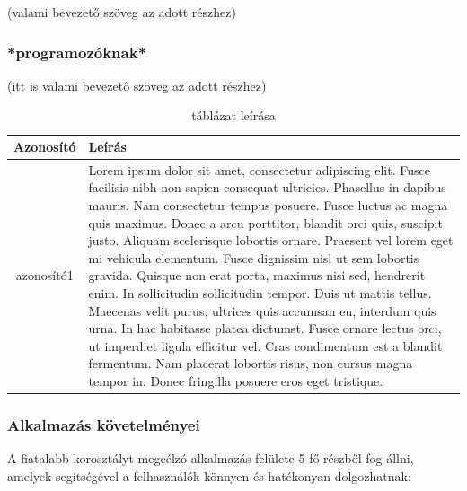 \documentclass{article}
\begin{document}
(valami bevezető szöveg az adott részhez)

\subsubsection{*programozóknak*}

(itt is valami bevezető szöveg az adott részhez)

\begin{table}[htbp]
\centering
\begin{tabular}{|c|p{14cm}|}
\hline
\textbf{Azonosító} & \textbf{Leírás}        \\ 
\hline
       azonosító1  & Lorem ipsum dolor sit amet, consectetur adipiscing elit. Fusce facilisis nibh non sapien consequat ultricies. Phasellus in dapibus mauris. Nam consectetur tempus posuere. Fusce luctus ac magna quis maximus. Donec a arcu porttitor, blandit orci quis, suscipit justo. Aliquam scelerisque lobortis ornare. Praesent vel lorem eget mi vehicula elementum. Fusce dignissim nisl ut sem lobortis gravida. Quisque non erat porta, maximus nisi sed, hendrerit enim. In sollicitudin sollicitudin tempor. Duis ut mattis tellus. Maecenas velit purus, ultrices quis accumsan eu, interdum quis urna. In hac habitasse platea dictumst. Fusce ornare lectus orci, ut imperdiet ligula efficitur vel. Cras condimentum est a blandit fermentum. Nam placerat lobortis risus, non cursus magna tempor in. Donec fringilla posuere eros eget tristique. \\
\hline
\end{tabular}
\caption{táblázat leírása}
\label{table:my_label}
\end{table}

\subsubsection{Alkalmazás követelményei}

A fiatalabb korosztályt megcélzó alkalmazás felülete 5 fő részből fog állni, amelyek segítségével a felhasználók könnyen és hatékonyan dolgozhatnak:
\end{document}
